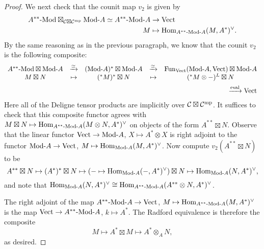 \documentclass{amsart}
\begin{document}
\begin{proof}
We next check that the counit map $v_2$ is given by
\begin{align*}
\Mod{A^{**}}{} \boxtimes_{\cC \boxtimes \cC^\mp} \Mod{}{A} \simeq \Mod{A^{**}}{A} &\ra \Vect \\
M &\mapsto \Hom_{\Mod{A^{**}}{A}}(M,A^*)^\vee.
\end{align*}
By the same reasoning as in the previous paragraph, we know that the counit $v_2$ is the following composite:
\[
\begin{array}{ccccc}
\Mod{A^{**}}{} \boxtimes \Mod{}{A} 
&\xra{\simeq}& (\Mod{}{A})^* \boxtimes \Mod{}{A} 
&\xra{\simeq}& \Fun_\Vect(\Mod{}{A},\Vect) \boxtimes \Mod{}{A} 
\\
M \boxtimes N 
&\mapsto& ({}^* M)^* \boxtimes N 
&\mapsto& ({}^* M \otimes -)^L \boxtimes N
\\[5pt]
&&&&\hfill \xra{\text{eval}} \Vect
\end{array}
\] 
Here all of the Deligne tensor products are implicitly over $\mathcal C \boxtimes \mathcal C^{\mathrm{mp}}$.  It suffices to check that this composite functor agrees with $M \boxtimes N \mapsto \Hom_{\Mod{A^{**}}{A}}(M \otimes N,A^*)^\vee$ on objects of the form $A^{**} \boxtimes N$.  Observe that the linear functor $\Vect \ra \Mod{}{A}$, $X \mapsto A^* \otimes X$ is right adjoint to the functor $\Mod{}{A} \ra \Vect$, $M \mapsto \Hom_{\Mod{}{A}}(M,A^*)^\vee$.  Now compute $v_2(A^{**} \boxtimes N)$ to be
\[
A^{**} \boxtimes N \mapsto (A^*)^* \boxtimes N \mapsto (- \mapsto \Hom_{\Mod{}{A}}(-,A^*)^\vee) \boxtimes N \mapsto \Hom_{\Mod{}{A}}(N,A^*)^\vee,
\]
and note that $\Hom_{\Mod{}{A}}(N,A^*)^\vee \cong \Hom_{\Mod{A^{**}}{A}}(A^{**} \otimes N,A^*)^\vee$.

The right adjoint of the map $\Mod{A^{**}}{A} \ra \Vect$, $M \mapsto \Hom_{\Mod{A^{**}}{A}}(M,A^*)^\vee$ is the map $\Vect \ra \Mod{A^{**}}{A}$, $k \mapsto A^*$.  The Radford equivalence is therefore the composite
\[
M \mapsto A^* \boxtimes M \mapsto A^* \otimes_A N,
\]
as desired.
\end{proof}
\end{document}
